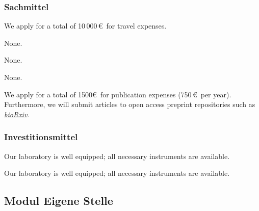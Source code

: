 \documentclass{scrartcl}
\begin{document}
\subsubsection{Sachmittel}
\begin{funds}



We apply for a total of 10\,000\,\euro\ for travel expenses.

None.

None.

None.

We apply for a total of 1500\euro\ for publication expenses (750\,\euro\ per
year). Furthermore, we will submit articles to open access preprint repositories
such as \href{https://www.biorxiv.org/}{\textit{bioRxiv}}.

\end{funds}

\subsubsection{Investitionsmittel}

Our laboratory is well equipped; all necessary instruments are available.

Our laboratory is well equipped; all necessary instruments are available.



\vspace*{2cm}

\subsection{Modul Eigene Stelle}
\end{document}
